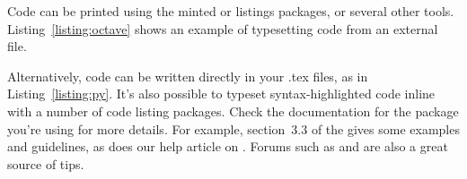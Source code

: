 Code can be printed using the minted or listings packages, or several other tools.
Listing~\ref{listing:octave} shows an example of typesetting code from an external file.


Alternatively, code can be written directly in your .tex files, as in Listing~\ref{listing:py}.
It's also possible to typeset syntax-highlighted code inline with a number of code listing packages.
Check the documentation for the package you're using for more details.
For example, section~3.3 of the  gives some examples and guidelines, as does our help article on . Forums such as  and  are also a great source of tips.

